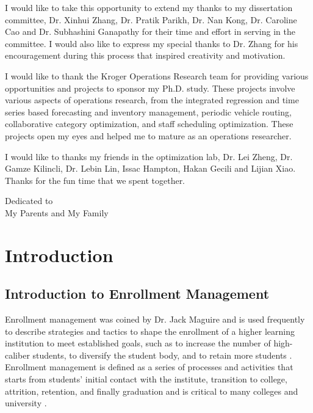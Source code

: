 \documentclass[12pt,english]{report}
\begin{document}
\setlength{\parindent}{2em}

I would like to take this opportunity to extend my thanks to my dissertation
committee,  Dr. Xinhui Zhang, Dr. Pratik Parikh, Dr. Nan Kong, Dr. Caroline Cao
and Dr. Subhashini Ganapathy for their time and effort in serving in the
committee.  I would also like to express my special thanks to Dr. Zhang for his
encouragement during this process that inspired creativity and motivation.

I would like to thank the Kroger Operations Research team for providing various
opportunities and projects to sponsor my Ph.D. study.  These projects involve
various aspects of operations research, from the integrated regression and time
series based forecasting and inventory management,  periodic vehicle routing,
collaborative category optimization, and staff scheduling optimization.  These
projects open my eyes and helped me to mature as an operations researcher.

I would like to thanks my friends in the optimization lab,  Dr. Lei Zheng, Dr.
Gamze Kilincli, Dr. Lebin Lin, Issac Hampton, Hakan Gecili and Lijian Xiao.
Thanks for the fun time that we spent together.

%
\newpage
\thispagestyle{plain}
\vspace*{3in}
\begin{center}
	Dedicated to\\
	My Parents and My Family
\end{center}
%
%
%

\newpage
\setcounter{page}{1}
\setlength{\parindent}{2em}
\chapter{Introduction}

\section{Introduction to Enrollment Management}

Enrollment management was coined by Dr. Jack Maguire \citep{Maguire1976} and is
used frequently to describe strategies and tactics to shape the enrollment of a
higher learning institution to meet established goals, such as to increase the
number of high-caliber students, to diversify the student body, and to retain
more students \citep{Kemerer1982}.   Enrollment management is defined as a
series of processes and activities that starts from students' initial contact
with the institute, transition to college, attrition, retention, and finally
graduation \citep{Hossler1990} and is critical to many colleges and university
\citep{Braunstein1999, Maltz2007, Aksenova2006}.
\end{document}
